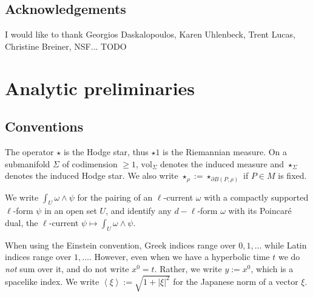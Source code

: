 \documentclass[reqno,10pt]{amsart}
\newcommand{\vol}{\mathrm{vol}}
\def\Japan#1{\left \langle #1 \right \rangle}
\theoremstyle{definition}
\numberwithin{equation}{section}
\begin{document}


\subsection{Acknowledgements}
I would like to thank Georgios Daskalopoulos, Karen Uhlenbeck, Trent Lucas, Christine Breiner, NSF... TODO



\section{Analytic preliminaries}\label{Prelims}
\subsection{Conventions}
The operator $\star$ is the Hodge star, thus $\star 1$ is the Riemannian measure.
On a submanifold $\Sigma$ of codimension $\geq 1$, $\vol_\Sigma$ denotes the induced measure and $\star_\Sigma$ denotes the induced Hodge star. We also write $\star_\rho := \star_{\partial B(P, \rho)}$ if $P \in M$ is fixed.

We write $\int_U \omega \wedge \psi$ for the pairing of an $\ell$-current $\omega$ with a compactly supported $\ell$-form $\psi$ in an open set $U$, and identify any $d - \ell$-form $\omega$ with its Poincar\'e dual, the $\ell$-current $\psi \mapsto \int_U \omega \wedge \psi$.

When using the Einstein convention, Greek indices range over $0, 1, \dots$ while Latin indices range over $1, \dots$.
However, even when we have a hyperbolic time $t$ we do \emph{not} sum over it, and do not write $x^0 = t$.
Rather, we write $y := x^0$, which is a spacelike index.
We write $\Japan \xi := \sqrt{1 + |\xi|^2}$ for the Japanese norm of a vector $\xi$.

\end{document}
